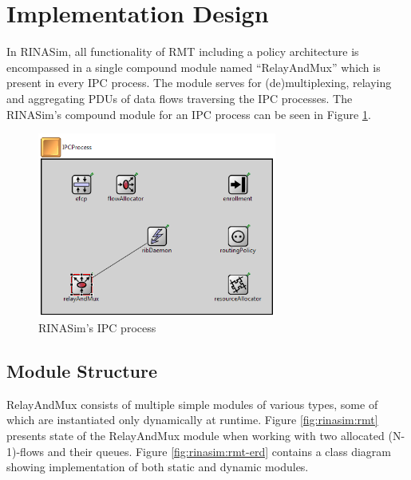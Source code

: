     \section{Implementation Design}

        In RINASim, all functionality of RMT including a policy architecture is encompassed in a single compound module named ``RelayAndMux'' which is present in every IPC process. The module serves for (de)multiplexing, relaying and aggregating PDUs of data flows traversing the IPC processes. The RINASim's compound module for an IPC process can be seen in Figure \ref{fig:rinasim:ipcp}.

        \begin{figure}[H]
                \begin{center}
                    \includegraphics[width=0.7\textwidth]{fig/impl_rinasim-ipcp.png}
                  \caption{RINASim's IPC process}
                  \label{fig:rinasim:ipcp}
                \end{center}
            \end{figure}

        \subsection{Module Structure}

            RelayAndMux consists of multiple simple modules of various types, some of which are instantiated only dynamically at runtime. Figure \ref{fig:rinasim:rmt} presents state of the RelayAndMux module when working with two allocated (N-1)-flows and their queues. Figure \ref{fig:rinasim:rmt-erd} contains a class diagram showing implementation of both static and dynamic modules.

